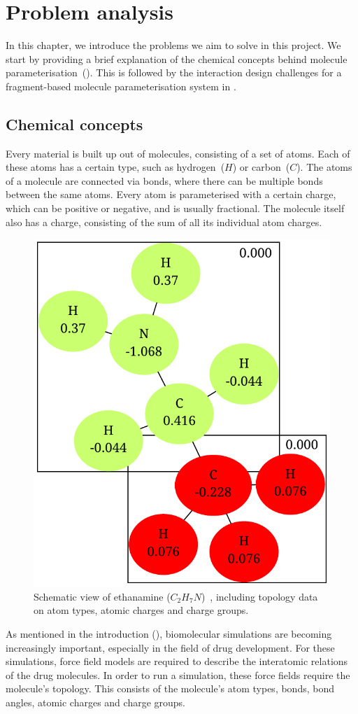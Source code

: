 \chapter{Problem analysis}

In this chapter, we introduce the problems we aim to solve in this project. We start by providing a brief explanation of the chemical concepts behind molecule parameterisation~(). This is followed by the interaction design challenges for a fragment-based molecule parameterisation system in .



\section{Chemical concepts}
Every material is built up out of molecules, consisting of a set of atoms. Each of these atoms has a certain type, such as hydrogen~($H$) or carbon~($C$). The atoms of a molecule are connected via bonds, where there can be multiple bonds between the same atoms. Every atom is parameterised with a certain charge, which can be positive or negative, and is usually fractional. The molecule itself also has a charge, consisting of the sum of all its individual atom charges.

\begin{figure}
\vspace{-2em}
\begin{center}
\includegraphics[width=.38\textwidth]{img/ethanamine.pdf}
\caption{Schematic view of ethanamine ($C_{2}H_{7}N$)~\cite{atb2014ethanamine}, including topology data on atom types, atomic charges and charge groups.}
\end{center}
\vspace{-2em}
\end{figure}

As mentioned in the introduction (), biomolecular simulations are becoming increasingly important, especially in the field of drug development. For these simulations, force field models are required to describe the interatomic relations of the drug molecules. In order to run a simulation, these force fields require the molecule's topology. This consists of the molecule's atom types, bonds, bond angles, atomic charges and charge groups.

